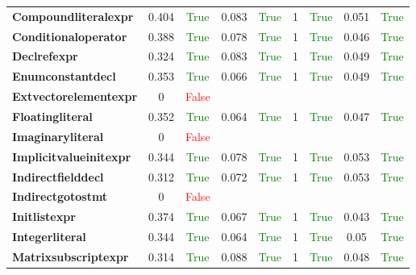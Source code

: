 \documentclass{article}
\begin{document}
\begin{xltabular}{\textwidth}{lcccccccc}
\textbf{{\fontsize{10}{12}\selectfont Compoundliteralexpr}}& 0.404&\textcolor{green}{True}& 0.083&\textcolor{green}{True}& 1&\textcolor{green}{True}& 0.051&\textcolor{green}{True} \\[0.5ex]
\textbf{{\fontsize{10}{12}\selectfont Conditionaloperator}}& 0.388&\textcolor{green}{True}& 0.078&\textcolor{green}{True}& 1&\textcolor{green}{True}& 0.046&\textcolor{green}{True} \\[0.5ex]
\textbf{{\fontsize{10}{12}\selectfont Declrefexpr}}& 0.324&\textcolor{green}{True}& 0.083&\textcolor{green}{True}& 1&\textcolor{green}{True}& 0.049&\textcolor{green}{True} \\[0.5ex]
\textbf{{\fontsize{10}{12}\selectfont Enumconstantdecl}}& 0.353&\textcolor{green}{True}& 0.066&\textcolor{green}{True}& 1&\textcolor{green}{True}& 0.049&\textcolor{green}{True} \\[0.5ex]
\textbf{{\fontsize{10}{12}\selectfont Extvectorelementexpr}}& 0&\textcolor{red}{False} \\[0.5ex]
\textbf{{\fontsize{10}{12}\selectfont Floatingliteral}}& 0.352&\textcolor{green}{True}& 0.064&\textcolor{green}{True}& 1&\textcolor{green}{True}& 0.047&\textcolor{green}{True} \\[0.5ex]
\textbf{{\fontsize{10}{12}\selectfont Imaginaryliteral}}& 0&\textcolor{red}{False} \\[0.5ex]
\textbf{{\fontsize{10}{12}\selectfont Implicitvalueinitexpr}}& 0.344&\textcolor{green}{True}& 0.078&\textcolor{green}{True}& 1&\textcolor{green}{True}& 0.053&\textcolor{green}{True} \\[0.5ex]
\textbf{{\fontsize{10}{12}\selectfont Indirectfielddecl}}& 0.312&\textcolor{green}{True}& 0.072&\textcolor{green}{True}& 1&\textcolor{green}{True}& 0.053&\textcolor{green}{True} \\[0.5ex]
\textbf{{\fontsize{10}{12}\selectfont Indirectgotostmt}}& 0&\textcolor{red}{False} \\[0.5ex]
\textbf{{\fontsize{10}{12}\selectfont Initlistexpr}}& 0.374&\textcolor{green}{True}& 0.067&\textcolor{green}{True}& 1&\textcolor{green}{True}& 0.043&\textcolor{green}{True} \\[0.5ex]
\textbf{{\fontsize{10}{12}\selectfont Integerliteral}}& 0.344&\textcolor{green}{True}& 0.064&\textcolor{green}{True}& 1&\textcolor{green}{True}& 0.05&\textcolor{green}{True} \\[0.5ex]
\textbf{{\fontsize{10}{12}\selectfont Matrixsubscriptexpr}}& 0.314&\textcolor{green}{True}& 0.088&\textcolor{green}{True}& 1&\textcolor{green}{True}& 0.048&\textcolor{green}{True} \\[0.5ex]

\end{xltabular}
\end{document}
